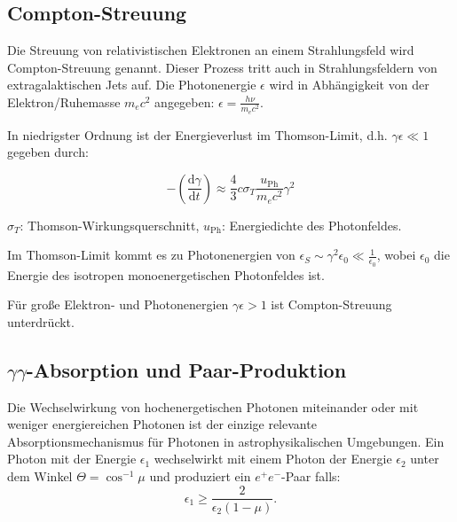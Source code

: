 \subsection{Compton-Streuung}
Die Streuung von relativistischen Elektronen an einem Strahlungsfeld wird Compton-Streuung genannt.
Dieser Prozess tritt auch in Strahlungsfeldern von extragalaktischen Jets auf.
Die Photonenergie $\epsilon$ wird in Abhängigkeit von der Elektron\-/Ruhemasse $m_e c^2$ angegeben: $\epsilon= \frac{h\nu}{m_e c^2}$. \cite{RelativisticJets}
 
In niedrigster Ordnung ist der Energieverlust im Thomson-Limit, d.h. $\gamma \epsilon \ll 1$ gegeben durch:

\begin{equation}
-\left(\frac{\mathrm{d}\gamma}{\mathrm{d}t} \right) \approx \frac{4}{3} c \sigma_T \frac{u_{\text{Ph}}}{m_e c^2} \gamma^2
\end{equation}

\begin{center}
 \begin{small}
  $\sigma_T$: Thomson-Wirkungsquerschnitt, $u_{\text{Ph}}$: Energiedichte des Photonfeldes.
 \end{small}
\end{center}

Im Thomson-Limit kommt es zu Photonenergien von $\epsilon_S \sim \gamma^2 \epsilon_0 \ll \frac{1}{\epsilon_0} $, wobei $\epsilon_0$ die Energie des isotropen monoenergetischen Photonfeldes ist.\cite{RelativisticJets}

Für große Elektron- und Photonenergien $\gamma \epsilon > 1$ ist Compton-Streuung unterdrückt.\cite{RelativisticJets}


\subsection{$\gamma\gamma$-Absorption und Paar-Produktion}
Die Wechselwirkung von hochenergetischen Photonen miteinander oder mit weniger energiereichen Photonen ist der einzige relevante Absorptionsmechanismus für Photonen in astrophysikalischen Umgebungen.
Ein Photon mit der Energie $\epsilon_1$ wechselwirkt mit einem Photon der Energie $\epsilon_2$ unter dem Winkel $\Theta=\cos^{-1}\mu$ und produziert ein $e^+e^-$-Paar falls:
\begin{equation}
 \epsilon_1 \geq \frac{2}{\epsilon_2 (1-\mu)}.
\end{equation}


